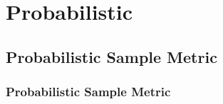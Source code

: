 \chapter{Probabilistic}


\clearpage
\thispagestyle{probabilisticstyle}
\section{Probabilistic Sample Metric}
\subsection{Probabilistic Sample Metric}